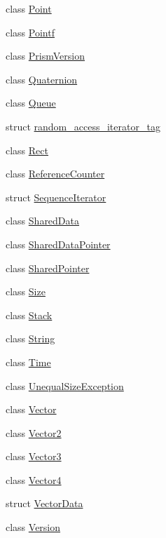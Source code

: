 \begin{DoxyCompactItemize}
\item 
class \hyperlink{classprism_1_1_point}{Point}
\item 
class \hyperlink{classprism_1_1_pointf}{Pointf}
\item 
class \hyperlink{classprism_1_1_prism_version}{Prism\+Version}
\item 
class \hyperlink{classprism_1_1_quaternion}{Quaternion}
\item 
class \hyperlink{classprism_1_1_queue}{Queue}
\item 
struct \hyperlink{structprism_1_1random__access__iterator__tag}{random\+\_\+access\+\_\+iterator\+\_\+tag}
\item 
class \hyperlink{classprism_1_1_rect}{Rect}
\item 
class \hyperlink{classprism_1_1_reference_counter}{Reference\+Counter}
\item 
struct \hyperlink{structprism_1_1_sequence_iterator}{Sequence\+Iterator}
\item 
class \hyperlink{classprism_1_1_shared_data}{Shared\+Data}
\item 
class \hyperlink{classprism_1_1_shared_data_pointer}{Shared\+Data\+Pointer}
\item 
class \hyperlink{classprism_1_1_shared_pointer}{Shared\+Pointer}
\item 
class \hyperlink{classprism_1_1_size}{Size}
\item 
class \hyperlink{classprism_1_1_stack}{Stack}
\item 
class \hyperlink{classprism_1_1_string}{String}
\item 
class \hyperlink{classprism_1_1_time}{Time}
\item 
class \hyperlink{classprism_1_1_unequal_size_exception}{Unequal\+Size\+Exception}
\item 
class \hyperlink{classprism_1_1_vector}{Vector}
\item 
class \hyperlink{classprism_1_1_vector2}{Vector2}
\item 
class \hyperlink{classprism_1_1_vector3}{Vector3}
\item 
class \hyperlink{classprism_1_1_vector4}{Vector4}
\item 
struct \hyperlink{structprism_1_1_vector_data}{Vector\+Data}
\item 
class \hyperlink{classprism_1_1_version}{Version}
\end{DoxyCompactItemize}
